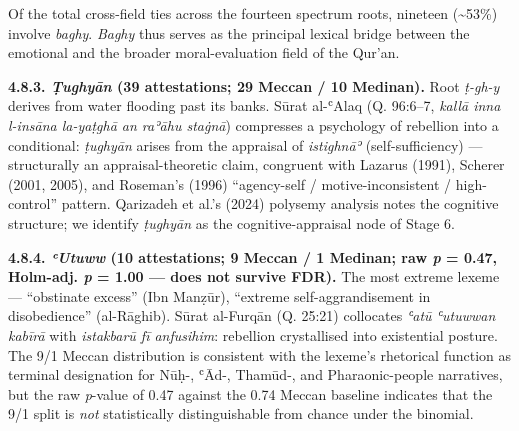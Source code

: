 Of the total cross-field ties across the fourteen spectrum roots,
nineteen (\textasciitilde53\%) involve \emph{baghy}. \emph{Baghy} thus
serves as the principal lexical bridge between the emotional and the
broader moral-evaluation field of the Qur'an.

\textbf{4.8.3. \emph{Ṭughyān} (39 attestations; 29 Meccan / 10
Medinan).} Root \emph{ṭ-gh-y} derives from water flooding past its
banks. Sūrat al-ʿAlaq (Q. 96:6--7, \emph{kallā inna l-insāna la-yaṭghā
an raʾāhu staġnā}) compresses a psychology of rebellion into a
conditional: \emph{ṭughyān} arises from the appraisal of
\emph{istighnāʾ} (self-sufficiency) --- structurally an
appraisal-theoretic claim, congruent with Lazarus (1991), Scherer (2001,
2005), and Roseman's (1996) ``agency-self / motive-inconsistent /
high-control'' pattern. Qarizadeh et al.'s (2024) polysemy analysis
notes the cognitive structure; we identify \emph{ṭughyān} as the
cognitive-appraisal node of Stage 6.

\textbf{4.8.4. \emph{ʿUtuww} (10 attestations; 9 Meccan / 1 Medinan; raw
\emph{p} = 0.47, Holm-adj. \emph{p} = 1.00 --- does not survive FDR).}
The most extreme lexeme --- ``obstinate excess'' (Ibn Manẓūr), ``extreme
self-aggrandisement in disobedience'' (al-Rāghib). Sūrat al-Furqān (Q.
25:21) collocates \emph{ʿatū ʿutuwwan kabīrā} with \emph{istakbarū fī
anfusihim}: rebellion crystallised into existential posture. The 9/1
Meccan distribution is consistent with the lexeme's rhetorical function
as terminal designation for Nūḥ-, ʿĀd-, Thamūd-, and Pharaonic-people
narratives, but the raw \emph{p}-value of 0.47 against the 0.74 Meccan
baseline indicates that the 9/1 split is \emph{not} statistically
distinguishable from chance under the binomial.

